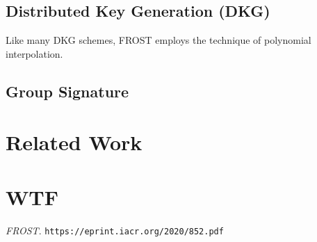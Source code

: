 \documentclass{article}
\begin{document}
\subsection{
  Distributed Key Generation (DKG)
}

Like many DKG schemes, FROST employs the technique of polynomial interpolation.


\subsection{
  Group Signature
}


\newpage
\onecolumn
\section{
  Related Work
}


\newpage
\onecolumn
\section{
  WTF
}


\newpage
\onecolumn
\begin{thebibliography}{1}

  \emph{FROST}.
  \texttt{https://eprint.iacr.org/2020/852.pdf}

\end{thebibliography}
\end{document}

